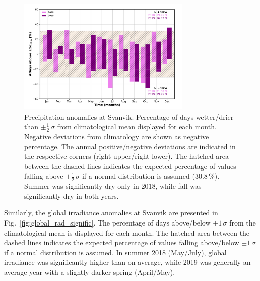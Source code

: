 \documentclass[bg, manuscript]{copernicus}
\begin{document}
\begin{figure}[t]
  \includegraphics[width=8.3cm]{fig09}
  \caption{Precipitation anomalies at Svanvik. Percentage of days wetter/drier than $\pm \frac{1}{2}\,\sigma$ from climatological mean displayed for each month. Negative deviations from climatology are shown as negative percentage. The annual positive/negative deviations are indicated in the respective corners (right upper/right lower). The hatched area between the dashed lines indicates the expected percentage of values falling above $\pm\frac{1}{2}\,\sigma$ if a normal distribution is assumed ($30.8\,\unit{\%}$). Summer was significantly dry only in 2018, while fall was significantly dry in both years.}
  \label{fig:plot_precipitation_anomalies_svanvik}
\end{figure}

Similarly, the global irradiance anomalies at Svanvik are presented in Fig.~\ref{fig:global_rad_signific}. The percentage of days above/below $\pm 1\,\sigma$ from the climatological mean is displayed for each month. The hatched area between the dashed lines indicates the expected percentage of values falling above/below $\pm 1\,\sigma$ if a normal distribution is assumed. In summer 2018 (May/July), global irradiance was significantly higher than on average, while 2019 was generally an average year with a slightly darker spring (April/May).
\end{document}
